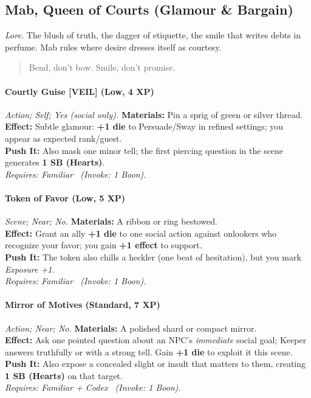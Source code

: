 \subsection{Mab, Queen of Courts (Glamour \& Bargain)}
\textit{Lore.} The blush of truth, the dagger of etiquette, the smile that writes debts in perfume. Mab rules where desire dresses itself as courtesy.

\begin{quote}
Bend, don’t bow. Smile, don’t promise.
\end{quote}

\paragraph{Courtly Guise \textnormal{[VEIL]} (Low, 4 XP)} \emph{Action; Self; Yes (social only).}
\textbf{Materials:} Pin a sprig of green or silver thread.\\
\textbf{Effect:} Subtle glamour: \textbf{+1 die} to Persuade/Sway in refined settings; you appear as expected rank/guest.\\
\textbf{Push It:} Also mask one minor tell; the first piercing question in the scene generates \textbf{1 SB (Hearts)}.\\
\emph{Requires: Familiar \ (\textit{Invoke:} 1 Boon).}

\paragraph{Token of Favor (Low, 5 XP)} \emph{Scene; Near; No.}
\textbf{Materials:} A ribbon or ring bestowed.\\
\textbf{Effect:} Grant an ally \textbf{+1 die} to one social action against onlookers who recognize your favor; you gain \textbf{+1 effect} to support.\\
\textbf{Push It:} The token also chills a heckler (one beat of hesitation), but you mark \emph{Exposure +1}.\\
\emph{Requires: Familiar \ (\textit{Invoke:} 1 Boon).}

\paragraph{Mirror of Motives (Standard, 7 XP)} \emph{Action; Near; No.}
\textbf{Materials:} A polished shard or compact mirror.\\
\textbf{Effect:} Ask one pointed question about an NPC’s \emph{immediate} social goal; Keeper answers truthfully or with a strong tell. Gain \textbf{+1 die} to exploit it this scene.\\
\textbf{Push It:} Also expose a concealed slight or insult that matters to them, creating \textbf{1 SB (Hearts)} on that target.\\
\emph{Requires: Familiar + Codex \ (\textit{Invoke:} 1 Boon).}

